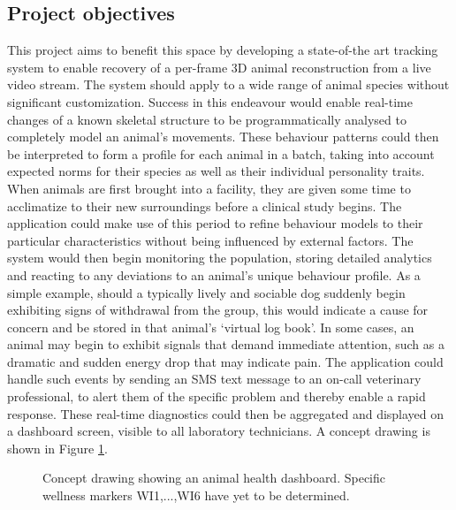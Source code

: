     \subsection{Project objectives}
    This project aims to benefit this space by developing a state-of-the art tracking system to enable recovery of a per-frame 3D animal reconstruction from a live video stream. The system should apply to a wide range of animal species without significant customization. Success in this endeavour would enable real-time changes of a known skeletal structure to be programmatically analysed to completely model an animal’s movements. These behaviour patterns could then be interpreted to form a profile for each animal in a batch, taking into account expected norms for their species as well as their individual personality traits. When animals are first brought into a facility, they are given some time to acclimatize to their new surroundings before a clinical study begins. The application could make use of this period to refine behaviour models to their particular characteristics without being influenced by external factors. The system would then begin monitoring the population, storing detailed analytics and reacting to any deviations to an animal’s unique behaviour profile. As a simple example, should a typically lively and sociable dog suddenly begin exhibiting signs of withdrawal from the group, this would indicate a cause for concern and be stored in that animal’s ‘virtual log book’. In some cases, an animal may begin to exhibit signals that demand immediate attention, such as a dramatic and sudden energy drop that may indicate pain. The application could handle such events by sending an SMS text message to an on-call veterinary professional, to alert them of the specific problem and thereby enable a rapid response. These real-time diagnostics could then be aggregated and displayed on a dashboard screen, visible to all laboratory technicians. A concept drawing is shown in Figure \ref{fig:wellness_dashboard}.

    \begin{figure}[H] %
        \caption{Concept drawing showing an animal health dashboard. Specific wellness markers WI1,...,WI6 have yet to be determined.}
        \label{fig:wellness_dashboard}
    \end{figure}

